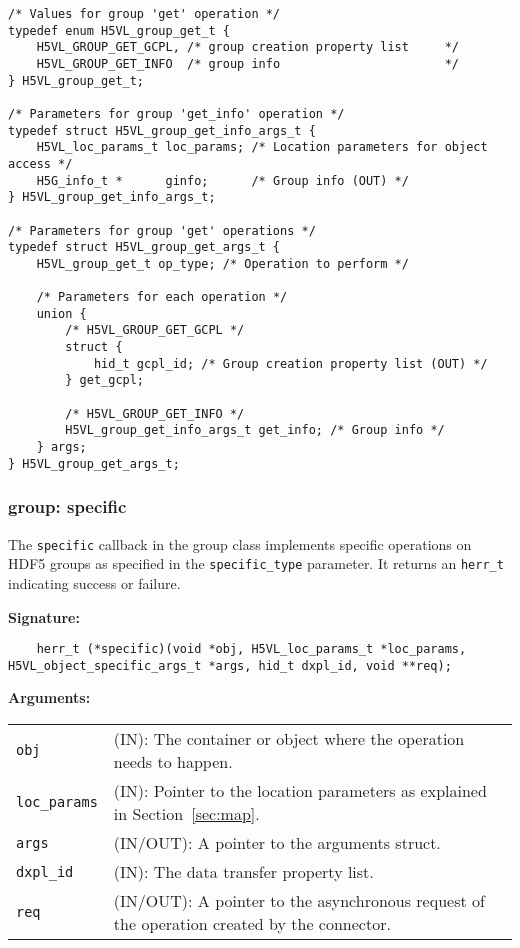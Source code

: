 \begin{lstlisting}
/* Values for group 'get' operation */
typedef enum H5VL_group_get_t {
    H5VL_GROUP_GET_GCPL, /* group creation property list     */
    H5VL_GROUP_GET_INFO  /* group info                       */
} H5VL_group_get_t;

/* Parameters for group 'get_info' operation */
typedef struct H5VL_group_get_info_args_t {
    H5VL_loc_params_t loc_params; /* Location parameters for object access */
    H5G_info_t *      ginfo;      /* Group info (OUT) */
} H5VL_group_get_info_args_t;

/* Parameters for group 'get' operations */
typedef struct H5VL_group_get_args_t {
    H5VL_group_get_t op_type; /* Operation to perform */

    /* Parameters for each operation */
    union {
        /* H5VL_GROUP_GET_GCPL */
        struct {
            hid_t gcpl_id; /* Group creation property list (OUT) */
        } get_gcpl;

        /* H5VL_GROUP_GET_INFO */
        H5VL_group_get_info_args_t get_info; /* Group info */
    } args;
} H5VL_group_get_args_t;

\end{lstlisting}

\subsubsection{group: specific}
The \texttt{specific} callback in the group class implements specific operations on HDF5 groups as specified in the \texttt{specific\_type} parameter. It returns an \texttt{herr\_t} indicating success or failure.\bigskip

\begin{mdframed}[style=bgbox]
\textbf{Signature:}
\begin{lstlisting}
	herr_t (*specific)(void *obj, H5VL_loc_params_t *loc_params, H5VL_object_specific_args_t *args, hid_t dxpl_id, void **req);
\end{lstlisting}

\textbf{Arguments:}\\
\begin{tabular}{l p{13.5cm}}
  \texttt{obj} & (IN): The container or object where the operation needs to happen.\\
  \texttt{loc\_params} & (IN): Pointer to the location parameters as explained in Section~\ref{sec:map}.\\
  \texttt{args} & (IN/OUT): A pointer to the arguments struct.\\
  \texttt{dxpl\_id} & (IN): The data transfer property list.\\
  \texttt{req} & (IN/OUT): A pointer to the asynchronous request of the
  operation created by the connector.\\
\end{tabular}
\end{mdframed}

